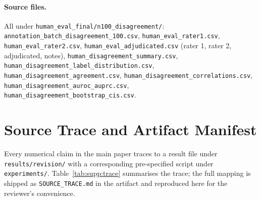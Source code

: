 \paragraph{Source files.}
\begin{sloppypar}
All under \texttt{human\_eval\_final/n100\_disagreement/}:
\texttt{annotation\_batch\_disagreement\_100.csv},
\texttt{human\_eval\_rater1.csv},
\texttt{human\_eval\_rater2.csv},
\texttt{human\_eval\_adjudicated.csv} (rater 1, rater 2, adjudicated, notes),
\texttt{human\_disagreement\_summary.csv},
\texttt{human\_disagreement\_label\_distribution.csv},
\texttt{human\_disagreement\_agreement.csv},
\texttt{human\_disagreement\_correlations.csv},
\texttt{human\_disagreement\_auroc\_auprc.csv},
\texttt{human\_disagreement\_bootstrap\_cis.csv}.
\end{sloppypar}

\section{Source Trace and Artifact Manifest}
\label{app:source_trace}

Every numerical claim in the main paper traces to a result file under
\texttt{results/revision/} with a corresponding pre-specified script
under \texttt{experiments/}. Table~\ref{tab:supp:trace} summarises the
trace; the full mapping is shipped as \texttt{SOURCE\_TRACE.md} in the
artifact and reproduced here for the reviewer's convenience.

